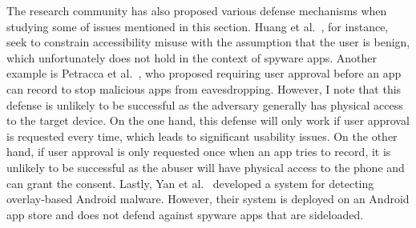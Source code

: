 The research community has also proposed various defense mechanisms when
studying some of issues mentioned in this section. Huang et
al.~\cite{huang2021a11y}, for instance, seek to constrain accessibility misuse
with the assumption that the user is benign, which unfortunately does not hold
in the context of spyware apps.
Another example is Petracca et
al.~\cite{petracca2015audroid}, who proposed requiring user approval before an
app can record to stop malicious apps from eavesdropping. However, I note that
this defense is unlikely to be successful as the adversary generally has physical access to the target device. On the one
hand, this defense will only work if user approval is requested every time,
which leads to significant usability issues. On the other hand, if user approval is
only requested once when an app tries to record, it is unlikely to be successful
as the abuser will have physical access to the phone and can grant the consent. Lastly, Yan et al.~\cite{yan2019understanding} developed a system for detecting overlay-based Android malware. However, their system is deployed on an Android app store and does not defend against spyware apps that are sideloaded.





